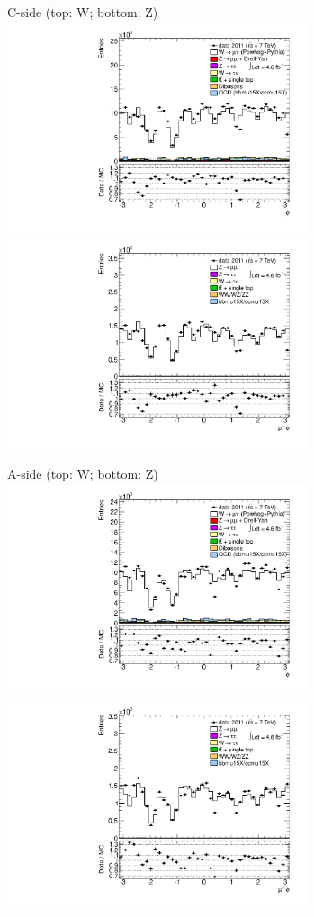 {

\colb[T]

C-side (top: W; bottom: Z)
\centering
\includegraphics[width=0.66\textwidth]{dates/20130306/figures/etaphi/W_2_C_stack_l_phi_POS} \\
\includegraphics[width=0.66\textwidth]{dates/20130306/figures/etaphi/Z_2_C_stack_lP_phi_ALL.pdf}

A-side (top: W; bottom: Z)
\centering
\includegraphics[width=0.66\textwidth]{dates/20130306/figures/etaphi/W_2_A_stack_l_phi_POS} \\
\includegraphics[width=0.66\textwidth]{dates/20130306/figures/etaphi/Z_2_A_stack_lP_phi_ALL.pdf} 

\cole
}


